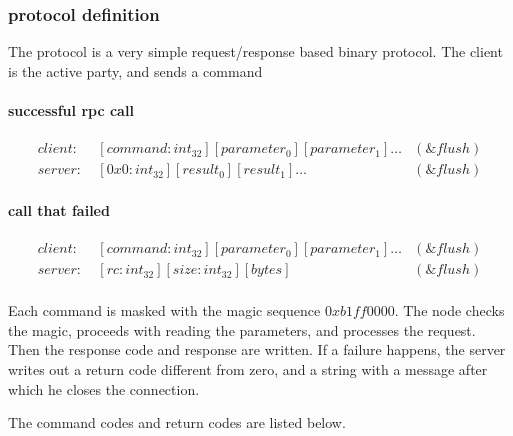 \subsubsection{protocol definition}
The protocol is a very simple request/response based binary protocol.
The client is the active party, and sends a command
\paragraph{successful rpc call}
\begin{equation*}
\begin{aligned}
client: \ & [command:int_{32}][parameter_0][parameter_1]\ldots & (\&flush) \\
server: \ & [0x0:int_{32}][result_0][result_1]\ldots & (\&flush)
\end{aligned}
\end{equation*}
\paragraph{call that failed}

\begin{equation*}
\begin{aligned}
client: \ & [command : int_{32}][parameter_0][parameter_1]\ldots & (\&flush) \\
server: \ & [rc:int_{32}][size:int_{32}][bytes] & (\&flush) \\
\end{aligned}
\end{equation*}

Each command is masked with the magic sequence $0xb1ff0000$.
The node checks the magic, proceeds with reading the parameters, and processes the request.
Then the response code and response are written.
If a failure happens, the server writes out a return code different from zero, and a string with a message after which he closes the connection.

The command codes and return codes are listed below.

